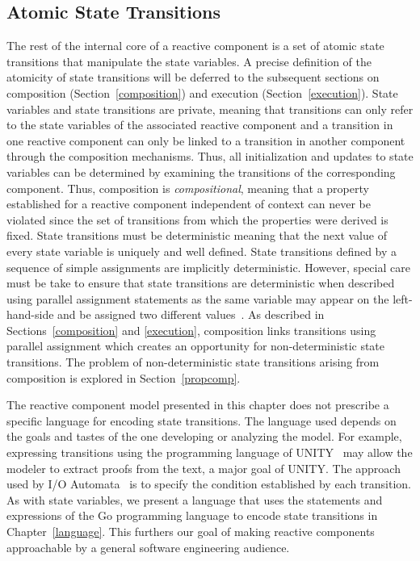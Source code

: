 \subsection{Atomic State Transitions}
The rest of the internal core of a reactive component is a set of atomic state transitions that manipulate the state variables.
A precise definition of the atomicity of state transitions will be deferred to the subsequent sections on composition (Section~\ref{composition}) and execution (Section~\ref{execution}).
State variables and state transitions are private, meaning that transitions can only refer to the state variables of the associated reactive component and a transition in one reactive component can only be linked to a transition in another component through the composition mechanisms.
Thus, all initialization and updates to state variables can be determined by examining the transitions of the corresponding component.
Thus, composition is \emph{compositional}, meaning that a property established for a reactive component independent of context can never be violated since the set of transitions from which the properties were derived is fixed.
State transitions must be deterministic meaning that the next value of every state variable is uniquely and well defined.
State transitions defined by a sequence of simple assignments are implicitly deterministic.
However, special care must be take to ensure that state transitions are deterministic when described using parallel assignment statements as the same variable may appear on the left-hand-side and be assigned two different values~\cite{chandy1989parallel}.
As described in Sections~\ref{composition} and \ref{execution}, composition links transitions using parallel assignment which creates an opportunity for non-deterministic state transitions.
The problem of non-deterministic state transitions arising from composition is explored in Section~\ref{propcomp}.

The reactive component model presented in this chapter does not prescribe a specific language for encoding state transitions.
The language used depends on the goals and tastes of the one developing or analyzing the model.
For example, expressing transitions using the programming language of UNITY~\cite{chandy1989parallel} may allow the modeler to extract proofs from the text, a major goal of UNITY.
The approach used by I/O Automata~\cite{nancy1996distributed} is to specify the condition established by each transition.
As with state variables, we present a language that uses the statements and expressions of the Go programming language to encode state transitions in Chapter~\ref{language}.
This furthers our goal of making reactive components approachable by a general software engineering audience.

